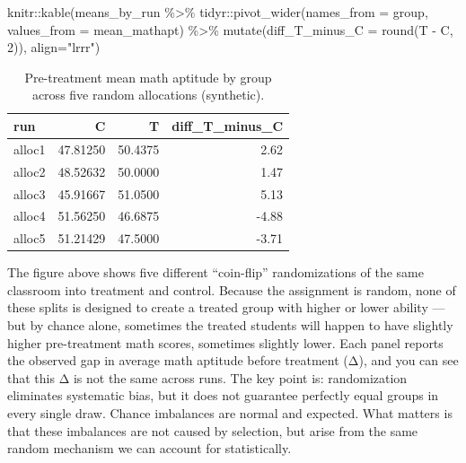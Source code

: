 \documentclass[
  letterpaper,
  DIV=11,
  numbers=noendperiod]{scrreprt}
\newenvironment{Shaded}{\begin{snugshade}}{\end{snugshade}}
\newcommand{\AttributeTok}[1]{\textcolor[rgb]{0.40,0.45,0.13}{#1}}
\newcommand{\DecValTok}[1]{\textcolor[rgb]{0.68,0.00,0.00}{#1}}
\newcommand{\FunctionTok}[1]{\textcolor[rgb]{0.28,0.35,0.67}{#1}}
\newcommand{\NormalTok}[1]{\textcolor[rgb]{0.00,0.23,0.31}{#1}}
\newcommand{\SpecialCharTok}[1]{\textcolor[rgb]{0.37,0.37,0.37}{#1}}
\newcommand{\StringTok}[1]{\textcolor[rgb]{0.13,0.47,0.30}{#1}}
\begin{document}
\begin{Shaded}
\begin{Highlighting}[]
\NormalTok{knitr}\SpecialCharTok{::}\FunctionTok{kable}\NormalTok{(means\_by\_run }\SpecialCharTok{\%\textgreater{}\%}\NormalTok{ tidyr}\SpecialCharTok{::}\FunctionTok{pivot\_wider}\NormalTok{(}\AttributeTok{names\_from =}\NormalTok{ group, }\AttributeTok{values\_from =}\NormalTok{ mean\_mathapt) }\SpecialCharTok{\%\textgreater{}\%}
               \FunctionTok{mutate}\NormalTok{(}\AttributeTok{diff\_T\_minus\_C =} \FunctionTok{round}\NormalTok{(T }\SpecialCharTok{{-}}\NormalTok{ C, }\DecValTok{2}\NormalTok{)),}
             \AttributeTok{align=}\StringTok{"lrrr"}\NormalTok{)}
\end{Highlighting}
\end{Shaded}

\begin{longtable}[]{@{}lrrr@{}}

\caption{\label{tbl-alloc-means}Pre-treatment mean math aptitude by
group across five random allocations (synthetic).}

\tabularnewline

\toprule\noalign{}
run & C & T & diff\_T\_minus\_C \\
\midrule\noalign{}
\endhead
\bottomrule\noalign{}
\endlastfoot
alloc1 & 47.81250 & 50.4375 & 2.62 \\
alloc2 & 48.52632 & 50.0000 & 1.47 \\
alloc3 & 45.91667 & 51.0500 & 5.13 \\
alloc4 & 51.56250 & 46.6875 & -4.88 \\
alloc5 & 51.21429 & 47.5000 & -3.71 \\

\end{longtable}

The figure above shows five different ``coin-flip'' randomizations of
the same classroom into treatment and control. Because the assignment is
random, none of these splits is designed to create a treated group with
higher or lower ability --- but by chance alone, sometimes the treated
students will happen to have slightly higher pre-treatment math scores,
sometimes slightly lower. Each panel reports the observed gap in average
math aptitude before treatment (Δ), and you can see that this Δ is not
the same across runs. The key point is: randomization eliminates
systematic bias, but it does not guarantee perfectly equal groups in
every single draw. Chance imbalances are normal and expected. What
matters is that these imbalances are not caused by selection, but arise
from the same random mechanism we can account for statistically.
\end{document}
